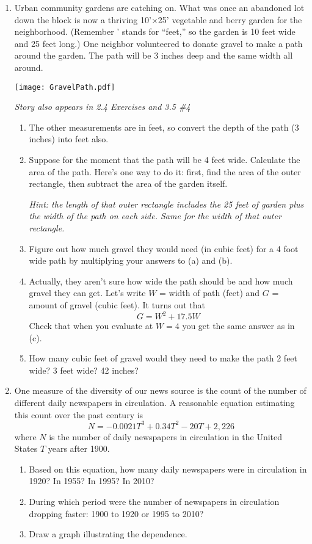 \begin{enumerate}
\item Urban community gardens are catching on.  What was once an abandoned lot down the block is now a thriving 10'$\times$25' vegetable and berry garden for the neighborhood. (Remember ' stands for ``feet,'' so the garden is 10 feet wide and 25 feet long.)  One neighbor volunteered to donate gravel to make a path around the garden.  The path will be 3 inches deep and the same width all around. 
\begin{center}
\scalebox {.4} {\texttt{[image: GravelPath.pdf]}}
\end{center}
 \hfill \emph{Story also appears in 2.4 Exercises and 3.5 \#4}
\begin{enumerate}
\item The other measurements are in feet, so convert the depth of the path (3 inches) into feet also.  
\item Suppose for the moment that the path will be 4 feet wide. Calculate the area of the path.  Here's one way to do it:  first, find the area of the outer rectangle, then subtract the area of the garden itself.

\emph{Hint:  the length of that outer rectangle includes the 25 feet of garden plus the width of the path on each side.   Same for the width of that outer rectangle.}
\item Figure out how much gravel they would need  (in cubic feet) for a 4 foot wide path by multiplying your answers to (a) and (b). 
\item  Actually, they aren't sure how wide the path should be and how much gravel they can get.  Let's write $W$ = width of path (feet) and $G$ = amount of gravel (cubic feet).  It turns out that $$G = W^2 + 17.5W$$
Check that when you evaluate at $W=4$ you get the same answer as in (c).
\item How many cubic feet of gravel would they need to make the path 2 feet wide? 3 feet wide?  42 inches? 
\end{enumerate}

\item One measure of the diversity of our news source is the count of the number of different daily newspapers in circulation.  A reasonable equation estimating this count over the past century is $$N = -0.0021T^3+0.34T^2-20T+ 2,226$$ where $N$ is the number of daily newspapers in circulation in the United States $T$ years after 1900.
\begin{enumerate}
\item Based on this equation, how many daily newspapers were in circulation in 1920?  In 1955?  In 1995?  In 2010?
\item During which period were the number of newspapers in circulation dropping faster:  1900 to 1920 or 1995 to 2010?
\item Draw a graph illustrating the dependence.
\end{enumerate}


\end{enumerate}
